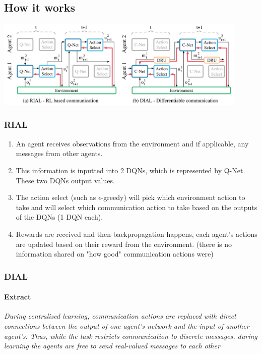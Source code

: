 \documentclass{article}
\begin{document}
    \subsection{How it works}
    \includegraphics[width=12.1cm]{fig1.png}    
    
    \subsubsection{RIAL}
    \begin{enumerate}
        \item An agent receives observations from the environment and if applicable, any messages from other agents.
        \item This information is inputted into 2 DQNs, which is represented by Q-Net. These two DQNs output values.
        \item The action select (such as $\epsilon$-greedy) will pick which environment action to take and will select which communication action to take based on the outputs of the DQNs (1 DQN each).
        \item Rewards are received and then backpropagation happens, each agent's actions are updated based on their reward from the environment. (there is no information shared on "how good" communication actions were)
    \end{enumerate}
    
    \subsubsection{DIAL}

    \paragraph{Extract} \emph{During centralised learning, communication actions are replaced with direct connections between the output of one agent's network and the input of another agent's. Thus, while the task restricts communication to discrete messages, during learning the agents are free to send real-valued messages to each other}
\end{document}
